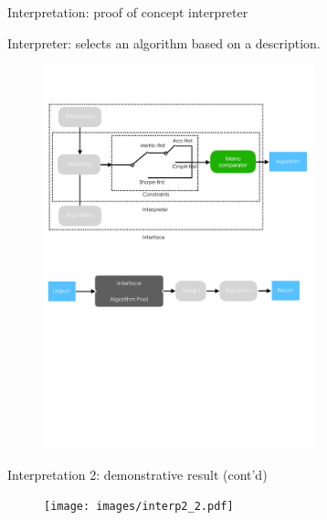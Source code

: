 \documentclass[10pt]{beamer}
\begin{document}

\begin{frame}{Interpretation: proof of concept interpreter}

Interpreter: selects an algorithm based on a description.

\begin{figure}[!htbp]
\centering
\includegraphics[width=0.7\textwidth]{interp/interpreter.pdf}
\end{figure}

\end{frame}

\begin{frame}{Interpretation 2: demonstrative result (cont'd)}

\begin{figure}
\centering
\texttt{[image: images/interp2\_2.pdf]}
\end{figure}

\end{frame}
\end{document}
